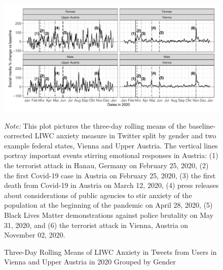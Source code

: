 \documentclass[
  english,
  jou,floatsintext]{apa7}
\begin{document}
\begin{figure}
\caption{Three-Day Rolling Means of LIWC Anxiety in Tweets from Users in Vienna and Upper Austria in 2020 Grouped by Gender}\label{fig:Anx-gender-region}
\includegraphics[width=\textwidth]{plots/plt_anxiety}

\textit{Note:} This plot pictures the three-day rolling means of the baseline-corrected LIWC anxiety measure in Twitter split by gender and two example federal states, Vienna and Upper Austria. The vertical lines portray important events stirring emotional responses in Austria: (1) the terrorist attack in Hanau, Germany on February 25, 2020, (2) the first Covid-19 case in Austria on February 25, 2020, (3) the first death from Covid-19 in Austria on March 12, 2020, (4) press releases about considerations of public agencies to stir anxiety of the population at the beginning of the pandemic on April 28, 2020, (5) Black Lives Matter demonstrations against police brutality on May 31, 2020, and (6) the terrorist attack in Vienna, Austria on November 02, 2020.  
\end{figure}
\end{document}

